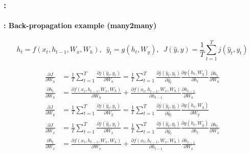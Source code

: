 \documentclass[xcolor=table]{beamer}
\begin{document}
\begin{frame}
	\frametitle{\insertshortsubtitle: \insertsection}
	\framesubtitle{\insertsubsection: Back-propagation example (many2many)}
	
	\[ h_t = f(x_t, h_{t-1}, W_x, W_h),\,\,\, \hat{y}_t = g(h_t, W_y),\,\,\,  J(\hat{y}, y) = \frac{1}{T} \sum_{t=1}^{T} j(\hat{y}_t, y_t)\]
	
	\begin{minipage}{0.6\textwidth}\scriptsize
		\begin{align*}
			\frac{\partial J}{\partial W_h} & = \frac{1}{T} \sum_{t=1}^{T} \frac{\partial j(\hat{y}_t, y_t)}{\partial W_h}
			= \frac{1}{T} \sum_{t=1}^{T} \frac{\partial j(\hat{y}_t, y_t)}{\partial \hat{y}_t} 
			\frac{\partial g(h_t, W_y)}{\partial h_t} 
			\frac{\partial h_t}{\partial W_h} \\
			\frac{\partial h_t}{\partial W_h} & = 
			\frac{\partial f(x_t, h_{t-1}, W_x, W_h)}{\partial W_h} + 
			\frac{\partial f(x_t, h_{t-1}, W_x, W_h)}{\partial h_{t-1}} \frac{\partial h_{t-1}}{\partial W_h} \\
			\frac{\partial J}{\partial W_y} & =
			\frac{1}{T} \sum_{t=1}^{T} \frac{\partial j(\hat{y}_t, y_t)}{\partial W_y}
			= \frac{1}{T} \sum_{t=1}^{T} \frac{\partial j(\hat{y}_t, y_t)}{\partial \hat{y}_t} 
			\frac{\partial g(h_t, W_y)}{\partial W_y} \\
			\frac{\partial J}{\partial W_x} & = 
			\frac{1}{T} \sum_{t=1}^{T} \frac{\partial j(\hat{y}_t, y_t)}{\partial W_x}
			= \frac{1}{T} \sum_{t=1}^{T} \frac{\partial j(\hat{y}_t, y_t)}{\partial \hat{y}_t} 
			\frac{\partial g(h_t, W_y)}{\partial h_t} 
			\frac{\partial h_t}{\partial W_x} \\
			\frac{\partial h_t}{\partial W_x} & = 
			\frac{\partial f(x_t, h_{t-1}, W_x, W_h)}{\partial W_x} + 
			\frac{\partial f(x_t, h_{t-1}, W_x, W_h)}{\partial h_{t-1}} \frac{\partial h_{t-1}}{\partial W_x} \\
		\end{align*}
	\end{minipage}
	\begin{minipage}{0.38\textwidth}
	\end{minipage}
	
\end{frame}
\end{document}
